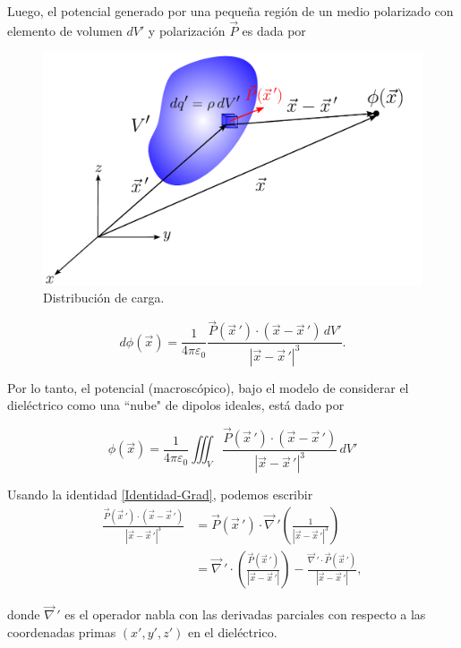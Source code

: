 Luego, el potencial generado por una pequeña región de un medio polarizado con elemento de volumen $dV'$ y polarización $\Vec{P}$ es dada por

\begin{figure}[H]
    \centering
    \includegraphics[scale = 0.6]{Figuras/Distribucion-Cargas-Polarizacion.pdf}
    \caption{Distribución de carga.}
    \label{fig:Distribu-Carga-3}
\end{figure}

$$d\phi(\Vec{x}) = \frac{1}{4\pi\varepsilon_0} \frac{\Vec{P}(\Vec{x}\,') \cdot (\Vec{x} - \Vec{x}\,') \,dV'}{|\Vec{x} - \Vec{x}\,'|^3}.$$

Por lo tanto, el potencial (macroscópico), bajo el modelo de considerar el dieléctrico como una ``nube" de dipolos ideales, está dado por 
\begin{shaded}
    $$\phi(\Vec{x}) = \frac{1}{4\pi \varepsilon_0} \iiint_V \frac{\Vec{P}(\Vec{x}\,') \cdot (\Vec{x} - \Vec{x}\,') }{|\Vec{x} - \Vec{x}\,'|^3} \,dV'$$
\end{shaded}

Usando la identidad \eqref{Identidad-Grad}, podemos escribir
\begin{align*}
    \frac{\Vec{P}(\Vec{x}\,') \cdot (\Vec{x} - \Vec{x}\,')}{|\Vec{x} - \vec{x}\,'|^3} &= \Vec{P}(\Vec{x}\,') \cdot \Vec{\nabla}\,' \left( \frac{1}{|\Vec{x} - \Vec{x}\,'|^3} \right) \\
    &= \Vec{\nabla}\,' \cdot \left( \frac{\Vec{P}(\vec{x}\,')}{|\Vec{x} - \Vec{x}\,'|} \right) - \frac{\Vec{\nabla}\,' \cdot \Vec{P}(\Vec{x}\,')}{|\Vec{x} - \Vec{x}\,'|},
\end{align*}

donde $\Vec{\nabla}\,'$ es el operador nabla con las derivadas parciales con respecto a las coordenadas primas $(x',y',z')$ en el dieléctrico.  

